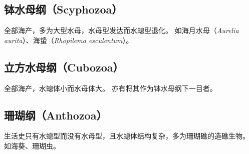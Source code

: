 \documentclass[11pt]{article}
\begin{document}
\subsection{钵水母纲（Scyphozoa）}
全部海产，多为大型水母，水母型发达而水螅型退化。
如海月水母（\textit{Aurelia aurita}）、海蛰（\textit{Rhopilema esculentum}）。

\subsection{立方水母纲（Cubozoa）}
全部海产，水螅体小而水母体大。
亦有将其作为钵水母纲下一目者。
  
\subsection{珊瑚纲（Anthozoa）}
生活史只有水螅型而没有水母型，且水螅体结构复杂，多为珊瑚礁的造礁生物。  
如海葵、珊瑚虫。
\end{document}
